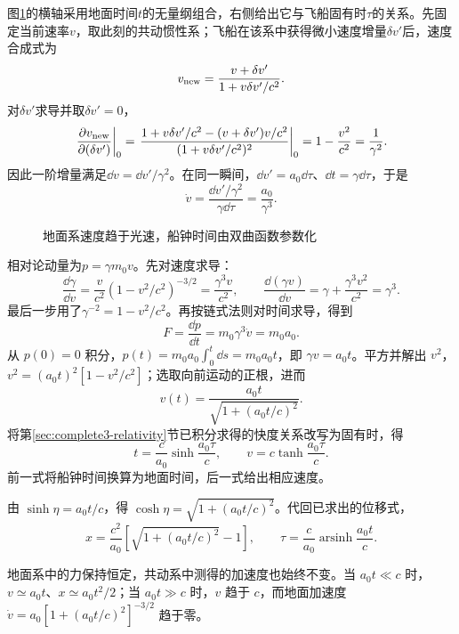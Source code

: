 \begin{solution}
图\ref{fig:hw3-7-s}的横轴采用地面时间$t$的无量纲组合，右侧给出它与飞船固有时$\tau$的关系。先固定当前速率$v$，取此刻的共动惯性系；飞船在该系中获得微小速度增量$\delta v'$后，速度合成式为
\[
v_{\rm new}=\frac{v+\delta v'}{1+v\delta v'/c^2}.
\]
对$\delta v'$求导并取$\delta v'=0$，
\[
\left.\frac{\partial v_{\rm new}}{\partial(\delta v')}\right|_0
=\left.\frac{1+v\delta v'/c^2-(v+\delta v')v/c^2}
{(1+v\delta v'/c^2)^2}\right|_0
=1-\frac{v^2}{c^2}=\frac1{\gamma^2}.
\]
因此一阶增量满足$\dd v=\dd v'/\gamma^2$。在同一瞬间，$\dd v'=a_0\dd\tau$、$\dd t=\gamma\dd\tau$，于是
\[
\dot v=\frac{\dd v'/\gamma^2}{\gamma\dd\tau}
=\frac{a_0}{\gamma^3}.
\]

\begin{figure}[H]\centering
{}
\caption{地面系速度趋于光速，船钟时间由双曲函数参数化}\label{fig:hw3-7-s}
\end{figure}

相对论动量为$p=\gamma m_0v$。先对速度求导：
\[
\frac{\dd\gamma}{\dd v}
=\frac{v}{c^2}(1-v^2/c^2)^{-3/2}
=\frac{\gamma^3v}{c^2},\qquad
\frac{\dd(\gamma v)}{\dd v}
=\gamma+\frac{\gamma^3v^2}{c^2}
=\gamma^3.
\]
最后一步用了$\gamma^{-2}=1-v^2/c^2$。再按链式法则对时间求导，得到
\[
 \boxed{F=\frac{\dd p}{\dd t}=m_0\gamma^3\dot v=m_0a_0}.
\]
从 $p(0)=0$ 积分，$p(t)=m_0a_0\int_0^t\dd s=m_0a_0t$，即 $\gamma v=a_0t$。平方并解出 $v^2$，$v^2=(a_0t)^2[1-v^2/c^2]$；选取向前运动的正根，进而
\[
 \boxed{v(t)=\frac{a_0t}{\sqrt{1+(a_0t/c)^2}}}.
\]
将第\ref{sec:complete3-relativity}节已积分求得的快度关系改写为固有时，得
\[
 t=\frac c{a_0}\sinh\frac{a_0\tau}{c},\qquad
 v=c\tanh\frac{a_0\tau}{c}.
\]
前一式将船钟时间换算为地面时间，后一式给出相应速度。

由 $\sinh\eta=a_0t/c$，得 $\cosh\eta=\sqrt{1+(a_0t/c)^2}$。代回已求出的位移式，
\[
x=\frac{c^2}{a_0}\left[\sqrt{1+(a_0t/c)^2}-1\right],
\qquad \tau=\frac c{a_0}\operatorname{arsinh}\frac{a_0t}c.
\]


地面系中的力保持恒定，共动系中测得的加速度也始终不变。当 $a_0t\ll c$ 时，$v\simeq a_0t$、$x\simeq a_0t^2/2$；当 $a_0t\gg c$ 时，$v$ 趋于 $c$，而地面加速度 $\dot v=a_0[1+(a_0t/c)^2]^{-3/2}$ 趋于零。

\end{solution}



